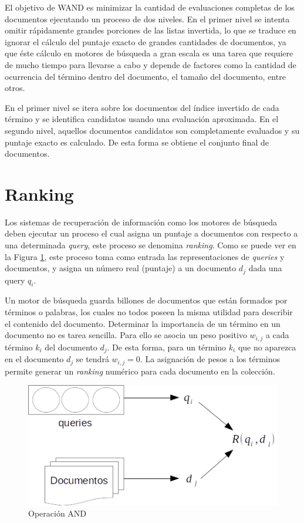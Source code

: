El objetivo de WAND es minimizar la cantidad de evaluaciones completas de los documentos ejecutando un proceso de dos niveles. En el primer nivel se intenta omitir rápidamente grandes porciones de las listas invertida, lo que se traduce en ignorar el cálculo del puntaje exacto de grandes cantidades de documentos, ya que éste cálculo en motores de búsqueda a gran escala es una tarea que requiere de mucho tiempo para llevarse a cabo y depende de factores como la cantidad de ocurrencia del término dentro del documento, el tamaño del documento, entre otros.  

En el primer nivel se itera sobre los documentos del índice invertido de cada término y se identifica candidatos usando una evaluación aproximada. En el segundo nivel, aquellos documentos candidatos son completamente evaluados y su puntaje exacto es calculado. De esta forma se obtiene el conjunto final de documentos.

\section{Ranking}
\label{marco:ranking}
Los sistemas de recuperación de información como los motores de búsqueda deben ejecutar un proceso el cual asigna un puntaje a documentos con respecto a una determinada \textit{query}, este proceso se denomina \textit{ranking}. Como se puede ver en la Figura \ref{fig:ranking_process}, este proceso toma como entrada las representaciones de \textit{queries} y documentos, y asigna un número real (puntaje) a un documento $d_{j}$ dada una query $q_{i}$.

Un motor de búsqueda guarda billones de documentos que están formados por términos o palabras, los cuales no todos poseen la misma utilidad para describir el contenido del documento. Determinar la importancia de un término en un documento no es tarea sencilla. Para ello se asocia un peso positivo $w_{i,j}$ a cada término $k_{i}$ del documento $d_{j}$. De esta forma, para un término $k_{i}$ que no aparezca en el documento $d_{j}$ se tendrá $w_{i,j} = 0$. La asignación de pesos a los términos permite generar un \textit{ranking} numérico para cada documento en la colección.


\begin{figure}[tp]
\centering
\includegraphics[scale=.75]{images/ranking_process.png}
\caption{Operaci\'on AND}
\label{fig:ranking_process}
\end{figure}


